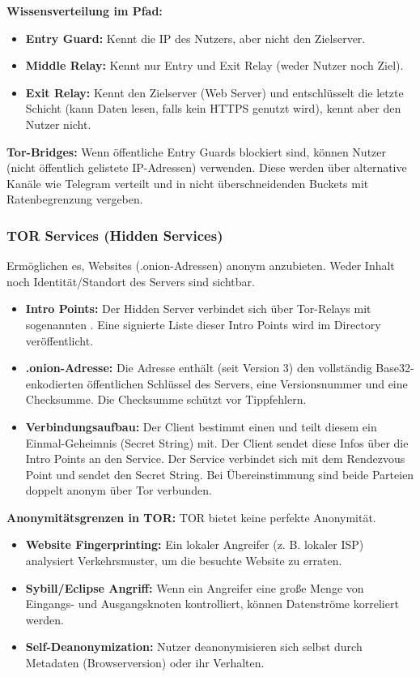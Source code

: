 \documentclass[
../../css_summary.tex,
]{subfiles}
\begin{document}
\textbf{Wissensverteilung im Pfad:}
\begin{itemize}
  \item \textbf{Entry Guard:} Kennt die IP des Nutzers, aber nicht den Zielserver.
  \item \textbf{Middle Relay:} Kennt nur Entry und Exit Relay (weder Nutzer noch Ziel).
  \item \textbf{Exit Relay:} Kennt den Zielserver (Web Server) und entschlüsselt die letzte Schicht (kann Daten lesen, falls kein HTTPS genutzt wird), kennt aber den Nutzer nicht.
\end{itemize}

\textbf{Tor-Bridges:} Wenn öffentliche Entry Guards blockiert sind, können Nutzer  (nicht öffentlich gelistete IP-Adressen) verwenden. Diese werden über alternative Kanäle wie Telegram verteilt und in nicht überschneidenden Buckets mit Ratenbegrenzung vergeben.

\subsubsection{TOR Services (Hidden Services)}
Ermöglichen es, Websites (.onion-Adressen) anonym anzubieten. Weder Inhalt noch Identität/Standort des Servers sind sichtbar.

\begin{itemize}
  \item \textbf{Intro Points:} Der Hidden Server verbindet sich über Tor-Relays mit sogenannten . Eine signierte Liste dieser Intro Points wird im Directory veröffentlicht.
  \item \textbf{.onion-Adresse:} Die Adresse enthält (seit Version 3) den vollständig Base32-enkodierten öffentlichen Schlüssel des Servers, eine Versionsnummer und eine Checksumme. Die Checksumme schützt vor Tippfehlern.
  \item \textbf{Verbindungsaufbau:} Der Client bestimmt einen  und teilt diesem ein Einmal-Geheimnis (Secret String) mit. Der Client sendet diese Infos über die Intro Points an den Service. Der Service verbindet sich mit dem Rendezvous Point und sendet den Secret String. Bei Übereinstimmung sind beide Parteien doppelt anonym über Tor verbunden.
\end{itemize}

\textbf{Anonymitätsgrenzen in TOR:}
TOR bietet keine perfekte Anonymität.
\begin{itemize}
  \item \textbf{Website Fingerprinting:} Ein lokaler Angreifer (z. B. lokaler ISP) analysiert Verkehrsmuster, um die besuchte Website zu erraten.
  \item \textbf{Sybill/Eclipse Angriff:} Wenn ein Angreifer eine große Menge von Eingangs- und Ausgangsknoten kontrolliert, können Datenströme korreliert werden.
  \item \textbf{Self-Deanonymization:} Nutzer deanonymisieren sich selbst durch Metadaten (Browserversion) oder ihr Verhalten.
\end{itemize}
\end{document}
